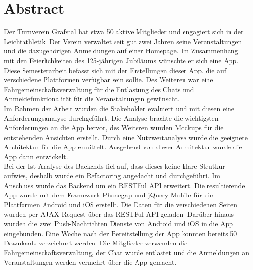 %
%

\thispagestyle{empty}



\newpage
\thispagestyle{empty}
\chapter*{Abstract}\label{abstract}
Der Turnverein Grafstal hat etwa 50 aktive Mitglieder und engagiert sich in der Leichtathletik. Der Verein verwaltet seit gut zwei Jahren seine Veranstaltungen und die dazugehörigen Anmeldungen auf einer Homepage. Im Zusammenhang mit den Feierlichkeiten des 125-jährigen Jubiläums wünschte er sich eine App.\\

Diese Semesterarbeit befasst sich mit der Erstellungen dieser App, die auf verschiedene Plattformen verfügbar sein sollte. Des Weiteren war eine Fahrgemeinschaftsverwaltung für die Entlastung des Chats und Anmeldefunktionalität für die Veranstaltungen gewünscht.\\

Im Rahmen der Arbeit wurden die Stakeholder evaluiert und mit diesen eine Anforderungsanalyse durchgeführt. Die Analyse brachte die wichtigsten Anforderungen an die App hervor, des Weiteren wurden Mockups für die entstehenden Ansichten erstellt. Durch eine Nutzwertanalyse wurde die geeignete Architektur für die App ermittelt. Ausgehend von dieser Architektur wurde die App dann entwickelt.\\

Bei der Ist-Analyse des Backends fiel auf, dass dieses keine klare Strutkur aufwies, deshalb wurde ein Refactoring angedacht und durchgeführt. Im Anschluss wurde das Backend um ein RESTFul API erweitert. Die resultierende App wurde mit dem Framework Phonegap und jQuery Mobile für die Plattformen Android und iOS erstellt. Die Daten für die verschiedenen Seiten wurden per AJAX-Request über das RESTFul API geladen. Darüber hinaus wurden die zwei Push-Nachrichten Dienste von Android und iOS in die App eingebunden. Eine Woche nach der Bereitstellung der App konnten bereits 50 Downloads verzeichnet werden. Die Mitglieder verwenden die Fahrgemeinschaftsverwaltung, der Chat wurde entlastet und die Anmeldungen an Veranstaltungen werden vermehrt über die App gemacht.

